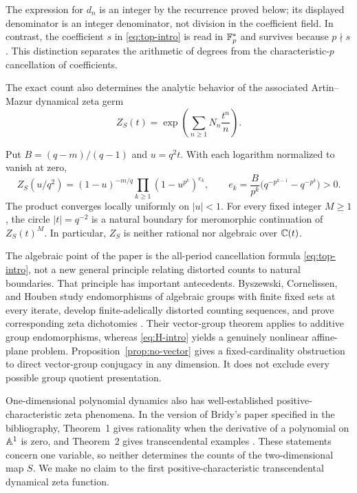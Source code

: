 The expression for $d_n$ is an integer by the recurrence proved below;
its displayed denominator is an integer denominator, not division in
the coefficient field. In contrast, the coefficient $s$ in
\eqref{eq:top-intro} is read in $\mathbb F_p^*$ and survives because $p\nmid s$.
This distinction separates the arithmetic of degrees from the
characteristic-$p$ cancellation of coefficients.

The exact count also determines the analytic behavior of the associated
Artin--Mazur dynamical zeta germ
\begin{equation}\label{eq:zeta-definition}
 Z_S(t)=\exp\left(\sum_{n\ge1}N_n\frac{t^n}{n}\right).
\end{equation}

\begin{corollary}\label{cor:zeta}
Put $B=(q-m)/(q-1)$ and $u=q^2t$. With each logarithm normalized to vanish
at zero,
\begin{equation}\label{eq:product-intro}
 Z_S(u/q^2)=(1-u)^{-m/q}
   \prod_{k\ge1}(1-u^{p^k})^{e_k},\qquad
 e_k=\frac{B}{p^k}\bigl(q^{-p^{k-1}}-q^{-p^k}\bigr)>0.
\end{equation}
The product converges locally uniformly on $|u|<1$. For every fixed
integer $M\ge1$, the circle $|t|=q^{-2}$ is a natural boundary for
meromorphic continuation of $Z_S(t)^M$. In particular, $Z_S$ is neither
rational nor algebraic over $\mathbb C(t)$.
\end{corollary}

The algebraic point of the paper is the all-period cancellation formula
\eqref{eq:top-intro}, not a new general principle relating distorted
counts to natural boundaries. That principle has important antecedents.
Byszewski, Cornelissen, and Houben study endomorphisms of algebraic
groups with finite fixed sets at every iterate, develop finite-adelically
distorted counting sequences, and prove corresponding zeta dichotomies
\cite[Theorems A and C, and \S5.2]{bch2024groups}.
Their vector-group theorem applies to additive group endomorphisms,
whereas \eqref{eq:H-intro} yields a genuinely nonlinear affine-plane
problem. Proposition~\ref{prop:no-vector} gives a fixed-cardinality
obstruction to direct vector-group conjugacy in any dimension.
It does not exclude every possible group quotient presentation.

One-dimensional polynomial dynamics also has well-established
positive-characteristic zeta phenomena. In the version of Bridy's paper
specified in the bibliography, Theorem~1 gives rationality when the
derivative of a polynomial on $\mathbb A^1$ is zero, and Theorem~2 gives
transcendental examples \cite{bridy2012transcendence}.
These statements concern one variable, so neither determines the counts
of the two-dimensional map $S$. We make no claim to the first
positive-characteristic transcendental dynamical zeta function.

